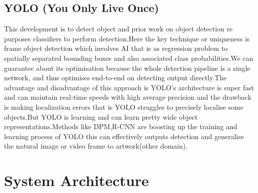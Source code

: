 \documentclass[conference]{IEEEtran}
\begin{document}
\subsection{YOLO (You Only Live Once)}
This development is to detect object and prior work on object detection re purposes classifiers to perform detection.Here the key technique or uniqueness is frame object detection which involves AI that is as regression problem to spatially separated bounding boxes and also associated class probabilities.We can guarantee about its optimisation because the whole detection pipeline is a single  network, and thus optimises end-to-end on detecting output directly.The advantage and disadvantage of this approach is YOLO's architecture is super fast and can maintain real-time speeds with high average precision and the drawback is making localization errors that is YOLO struggles to precisely localise some objects.But YOLO is learning and can learn pretty wide object representations.Methods like DPM,R-CNN are boosting up the training and learning process of YOLO this can effectively outputs detection and generalise the natural image or video frame to artwork(other domain).
\section{System Architecture}
\end{document}
